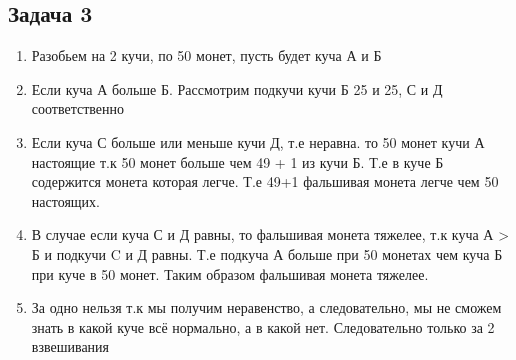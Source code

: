 \documentclass[a4paper,12pt]{article}
\begin{document}
\subsection{Задача 3}
\begin{enumerate}
    \item Разобьем на 2 кучи, по 50 монет, пусть будет куча А и Б
    \item Если куча А больше Б. Рассмотрим подкучи кучи Б 25 и 25, С и Д соответственно
    \item Если куча С больше или меньше кучи Д, т.е неравна. то 50 монет кучи А настоящие т.к 50 монет больше чем 49 + 1 из кучи Б. Т.е в куче Б содержится монета которая легче. Т.е 49+1 фальшивая монета легче чем 50 настоящих.
    \item В случае если куча С и Д равны, то фальшивая монета тяжелее, т.к куча А > Б и подкучи C и Д равны. Т.е подкуча А больше при 50 монетах чем куча Б при куче в 50 монет. Таким образом фальшивая монета тяжелее.
    \item За одно нельзя т.к мы получим неравенство, а следовательно, мы не сможем знать в какой куче всё нормально, а в какой нет. Следовательно только за 2 взвешивания
\end{enumerate}
\end{document}
